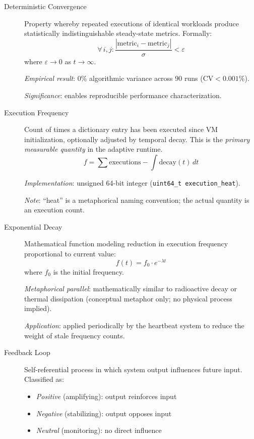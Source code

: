 \begin{description}
\item[Deterministic Convergence]
Property whereby repeated executions of identical workloads produce
statistically indistinguishable steady-state metrics. Formally:
\begin{equation*}
  \forall\, i, j\colon \frac{|\text{metric}_i - \text{metric}_j|}{\sigma} < \varepsilon
\end{equation*}
where $\varepsilon \to 0$ as $t \to \infty$.

\textit{Empirical result}: 0\% algorithmic variance across 90 runs
($\mathrm{CV} < 0.001\%$).

\textit{Significance}: enables reproducible performance characterization.

\item[Execution Frequency]
Count of times a dictionary entry has been executed since VM initialization,
optionally adjusted by temporal decay. This is the \emph{primary measurable
quantity} in the adaptive runtime.
\begin{equation*}
  f = \sum \text{executions} - \int \text{decay}(t)\,dt
\end{equation*}

\textit{Implementation}: unsigned 64-bit integer (\texttt{uint64\_t
execution\_heat}).

\textit{Note}: ``heat'' is a metaphorical naming convention; the actual
quantity is an execution count.

\item[Exponential Decay]
Mathematical function modeling reduction in execution frequency proportional
to current value:
\begin{equation*}
  f(t) = f_0 \cdot e^{-\lambda t}
\end{equation*}
where $f_0$ is the initial frequency.

\textit{Metaphorical parallel}: mathematically similar to radioactive decay
or thermal dissipation (conceptual metaphor only; no physical process implied).

\textit{Application}: applied periodically by the heartbeat system to reduce
the weight of stale frequency counts.

\item[Feedback Loop]
Self-referential process in which system output influences future input.
Classified as:
\begin{itemize}
  \item \emph{Positive} (amplifying): output reinforces input
  \item \emph{Negative} (stabilizing): output opposes input
  \item \emph{Neutral} (monitoring): no direct influence
\end{itemize}


\end{description}
